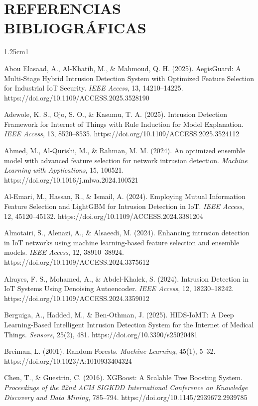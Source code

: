 \chapter*{REFERENCIAS BIBLIOGRÁFICAS}

\begin{hangparas}{1.25cm}{1}

Abou Elasaad, A., Al-Khatib, M., \& Mahmoud, Q. H. (2025). AegisGuard: A Multi-Stage Hybrid Intrusion Detection System with Optimized Feature Selection for Industrial IoT Security. \textit{IEEE Access}, 13, 14210--14225. https://doi.org/10.1109/ACCESS.2025.3528190

Adewole, K. S., Ojo, S. O., \& Kasumu, T. A. (2025). Intrusion Detection Framework for Internet of Things with Rule Induction for Model Explanation. \textit{IEEE Access}, 13, 8520--8535. https://doi.org/10.1109/ACCESS.2025.3524112

Ahmed, M., Al-Qurishi, M., \& Rahman, M. M. (2024). An optimized ensemble model with advanced feature selection for network intrusion detection. \textit{Machine Learning with Applications}, 15, 100521. https://doi.org/10.1016/j.mlwa.2024.100521

Al-Emari, M., Hassan, R., \& Ismail, A. (2024). Employing Mutual Information Feature Selection and LightGBM for Intrusion Detection in IoT. \textit{IEEE Access}, 12, 45120--45132. https://doi.org/10.1109/ACCESS.2024.3381204

Almotairi, S., Alenazi, A., \& Alsaeedi, M. (2024). Enhancing intrusion detection in IoT networks using machine learning-based feature selection and ensemble models. \textit{IEEE Access}, 12, 38910--38924. https://doi.org/10.1109/ACCESS.2024.3375612

Alrayes, F. S., Mohamed, A., \& Abdel-Khalek, S. (2024). Intrusion Detection in IoT Systems Using Denoising Autoencoder. \textit{IEEE Access}, 12, 18230--18242. https://doi.org/10.1109/ACCESS.2024.3359012

Berguiga, A., Hadded, M., \& Ben-Othman, J. (2025). HIDS-IoMT: A Deep Learning-Based Intelligent Intrusion Detection System for the Internet of Medical Things. \textit{Sensors}, 25(2), 481. https://doi.org/10.3390/s25020481

Breiman, L. (2001). Random Forests. \textit{Machine Learning}, 45(1), 5--32. https://doi.org/10.1023/A:1010933404324

Chen, T., \& Guestrin, C. (2016). XGBoost: A Scalable Tree Boosting System. \textit{Proceedings of the 22nd ACM SIGKDD International Conference on Knowledge Discovery and Data Mining}, 785--794. https://doi.org/10.1145/2939672.2939785


\end{hangparas}
